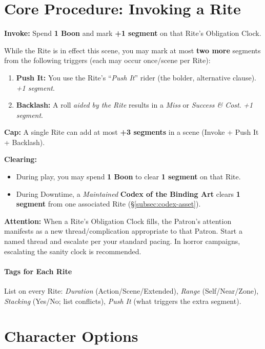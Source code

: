 \documentclass[12pt,twoside]{book}
\begin{document}
\section{Core Procedure: Invoking a Rite}
\label{sec:rite-procedure}
\textbf{Invoke:} Spend \textbf{1 Boon} and mark \textbf{+1 segment} on that Rite's Obligation Clock.

While the Rite is in effect this scene, you may mark at most \textbf{two more} segments from the following triggers (each may occur once/scene per Rite):
\begin{enumerate}
  \item \textbf{Push It:} You use the Rite's ``\emph{Push It}'' rider (the bolder, alternative clause). \emph{+1 segment}.
  \item \textbf{Backlash:} A roll \emph{aided by the Rite} results in a \emph{Miss} or \emph{Success \& Cost}. \emph{+1 segment}.
\end{enumerate}
\textbf{Cap:} A single Rite can add at most \textbf{+3 segments} in a scene (Invoke + Push It + Backlash).

\textbf{Clearing:}
\begin{itemize}
  \item During play, you may spend \textbf{1 Boon} to clear \textbf{1 segment} on that Rite.
  \item During Downtime, a \emph{Maintained} \textbf{Codex of the Binding Art} clears \textbf{1 segment} from one associated Rite (\S\ref{subsec:codex-asset}).
\end{itemize}

\textbf{Attention:} When a Rite's Obligation Clock fills, the Patron's attention manifests as a new thread/complication appropriate to that Patron. Start a named thread and escalate per your standard pacing. In horror campaigns, escalating the sanity clock is recommended.

\paragraph{Tags for Each Rite} List on every Rite:
\emph{Duration} (Action/Scene/Extended), \emph{Range} (Self/Near/Zone), \emph{Stacking} (Yes/No; list conflicts), \emph{Push It} (what triggers the extra segment).

\section{Character Options}
\end{document}

